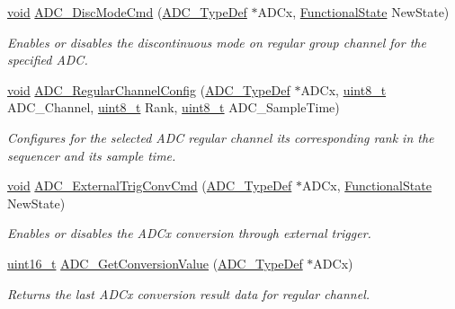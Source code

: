 \begin{DoxyCompactItemize}
\hyperlink{usb__devapi_8h_afabf60e7f57651d6d595a02c75f07cd0}{void} \hyperlink{group___a_d_c___exported___functions_ga1909649d10253ce88d986ffbb94a4be6}{A\+D\+C\+\_\+\+Disc\+Mode\+Cmd} (\hyperlink{struct_a_d_c___type_def}{A\+D\+C\+\_\+\+Type\+Def} $\ast$A\+D\+Cx, \hyperlink{agilefox_2library_2inc_2stm32f10x__type_8h_ac9a7e9a35d2513ec15c3b537aaa4fba1}{Functional\+State} New\+State)
\begin{DoxyCompactList}\small\item\em Enables or disables the discontinuous mode on regular group channel for the specified A\+DC. \end{DoxyCompactList}\item 
\hyperlink{usb__devapi_8h_afabf60e7f57651d6d595a02c75f07cd0}{void} \hyperlink{group___a_d_c___exported___functions_gac531adb577b648d4bb8881f2ed627d52}{A\+D\+C\+\_\+\+Regular\+Channel\+Config} (\hyperlink{struct_a_d_c___type_def}{A\+D\+C\+\_\+\+Type\+Def} $\ast$A\+D\+Cx, \hyperlink{_p_e___types_8h_aba7bc1797add20fe3efdf37ced1182c5}{uint8\+\_\+t} A\+D\+C\+\_\+\+Channel, \hyperlink{_p_e___types_8h_aba7bc1797add20fe3efdf37ced1182c5}{uint8\+\_\+t} Rank, \hyperlink{_p_e___types_8h_aba7bc1797add20fe3efdf37ced1182c5}{uint8\+\_\+t} A\+D\+C\+\_\+\+Sample\+Time)
\begin{DoxyCompactList}\small\item\em Configures for the selected A\+DC regular channel its corresponding rank in the sequencer and its sample time. \end{DoxyCompactList}\item 
\hyperlink{usb__devapi_8h_afabf60e7f57651d6d595a02c75f07cd0}{void} \hyperlink{group___a_d_c___exported___functions_ga3ae92d7940a16c898223374a5857f509}{A\+D\+C\+\_\+\+External\+Trig\+Conv\+Cmd} (\hyperlink{struct_a_d_c___type_def}{A\+D\+C\+\_\+\+Type\+Def} $\ast$A\+D\+Cx, \hyperlink{agilefox_2library_2inc_2stm32f10x__type_8h_ac9a7e9a35d2513ec15c3b537aaa4fba1}{Functional\+State} New\+State)
\begin{DoxyCompactList}\small\item\em Enables or disables the A\+D\+Cx conversion through external trigger. \end{DoxyCompactList}\item 
\hyperlink{_p_e___types_8h_a1f1825b69244eb3ad2c7165ddc99c956}{uint16\+\_\+t} \hyperlink{group___a_d_c___exported___functions_gaaf74221c285ec5dab5e66baf7bec6bd3}{A\+D\+C\+\_\+\+Get\+Conversion\+Value} (\hyperlink{struct_a_d_c___type_def}{A\+D\+C\+\_\+\+Type\+Def} $\ast$A\+D\+Cx)
\begin{DoxyCompactList}\small\item\em Returns the last A\+D\+Cx conversion result data for regular channel. \end{DoxyCompactList}\item 

\end{DoxyCompactItemize}
